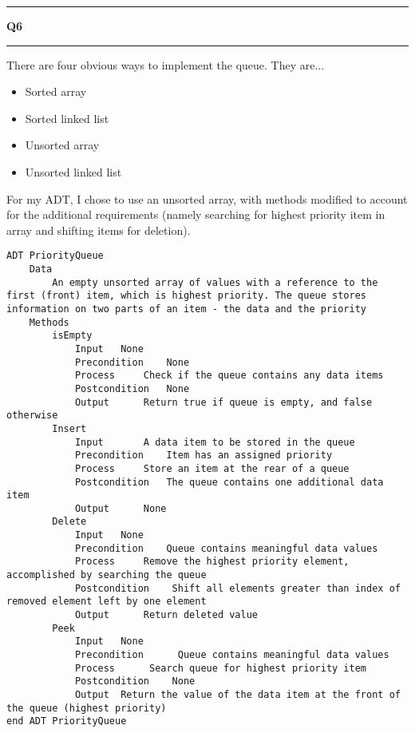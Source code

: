 \documentclass[11pt]{article}
\newcommand\question[2]{\vspace{.25in}\hrule\textbf{#1 #2}\vspace{.5em}\hrule\vspace{.10in}}
\begin{document}
\question{Q6}{}
There are four obvious ways to implement the queue. They are...
\begin{itemize}
	\item Sorted array
	\item Sorted linked list
	\item Unsorted array
	\item Unsorted linked list
\end{itemize}
For my ADT, I chose to use an unsorted array, with methods modified to account for the additional requirements (namely searching for highest priority item in array and shifting items for deletion).
\begin{lstlisting}
ADT PriorityQueue
	Data
		An empty unsorted array of values with a reference to the first (front) item, which is highest priority. The queue stores information on two parts of an item - the data and the priority
	Methods
		isEmpty
			Input  	None
			Precondition  	None
			Process  	Check if the queue contains any data items
			Postcondition  	None
			Output  	Return true if queue is empty, and false otherwise
		Insert
			Input   	A data item to be stored in the queue
			Precondition  	Item has an assigned priority
			Process  	Store an item at the rear of a queue
			Postcondition  	The queue contains one additional data item
			Output  	None
		Delete
			Input  	None
			Precondition  	Queue contains meaningful data values
			Process  	Remove the highest priority element, accomplished by searching the queue
			Postcondition 	 Shift all elements greater than index of removed element left by one element
			Output  	Return deleted value	
		Peek
			Input  	None
			Precondition	  Queue contains meaningful data values
			Process 	 Search queue for highest priority item
			Postcondition 	 None
			Output 	Return the value of the data item at the front of the queue (highest priority)
end ADT PriorityQueue	
\end{lstlisting}
\end{document}
